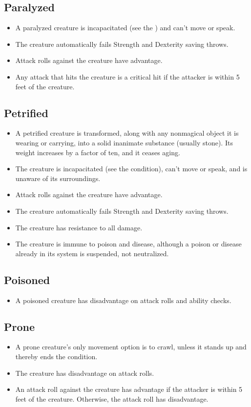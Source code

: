 \subsection{Paralyzed\label{condition:paralyzed}}
\begin{itemize}
\item A paralyzed creature is incapacitated (see the ) and can't move or speak.
\item The creature automatically fails Strength and Dexterity saving throws.
\item Attack rolls against the creature have advantage.
\item Any attack that hits the creature is a critical hit if the attacker is within 5 feet of the creature.
\end{itemize}

\subsection{Petrified\label{condition:petrified}}
\begin{itemize}
\item A petrified creature is transformed, along with any nonmagical object it is wearing or carrying, into a solid inanimate substance (usually stone). Its weight increases by a factor of ten, and it ceases aging.
\item The creature is incapacitated (see the condition), can't move or speak, and is unaware of its surroundings.
\item Attack rolls against the creature have advantage.
\item The creature automatically fails Strength and Dexterity saving throws.
\item The creature has resistance to all damage.
\item The creature is immune to poison and disease, although a poison or disease already in its system is suspended, not neutralized.
\end{itemize}

\subsection{Poisoned\label{condition:poisoned}}
\begin{itemize}
\item A poisoned creature has disadvantage on attack rolls and ability checks.
\end{itemize}

\subsection{Prone\label{condition:prone}}
\begin{itemize}
\item A prone creature's only movement option is to crawl, unless it stands up and thereby ends the condition.
\item The creature has disadvantage on attack rolls.
\item An attack roll against the creature has advantage if the attacker is within 5 feet of the creature. Otherwise, the attack roll has disadvantage.
\end{itemize}

